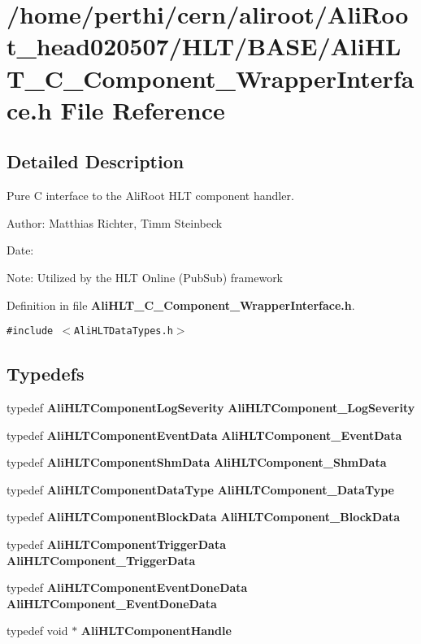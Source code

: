\section{/home/perthi/cern/aliroot/Ali\-Root\_\-head020507/HLT/BASE/Ali\-HLT\_\-C\_\-Component\_\-Wrapper\-Interface.h File Reference}
\label{AliHLT__C__Component__WrapperInterface_8h}


\subsection{Detailed Description}
Pure C interface to the Ali\-Root HLT component handler. 

\begin{Desc}
\item[Author:]Matthias Richter, Timm Steinbeck \end{Desc}
\begin{Desc}
\item[Date:]\end{Desc}
\begin{Desc}
\item[Note:]Utilized by the HLT Online (Pub\-Sub) framework\end{Desc}


Definition in file {\bf Ali\-HLT\_\-C\_\-Component\_\-Wrapper\-Interface.h}.

{\tt \#include $<$Ali\-HLTData\-Types.h$>$}\par
\subsection*{Typedefs}
\begin{CompactItemize}
\item 
typedef {\bf Ali\-HLTComponent\-Log\-Severity} {\bf Ali\-HLTComponent\_\-Log\-Severity}
\item 
typedef {\bf Ali\-HLTComponent\-Event\-Data} {\bf Ali\-HLTComponent\_\-Event\-Data}
\item 
typedef {\bf Ali\-HLTComponent\-Shm\-Data} {\bf Ali\-HLTComponent\_\-Shm\-Data}
\item 
typedef {\bf Ali\-HLTComponent\-Data\-Type} {\bf Ali\-HLTComponent\_\-Data\-Type}
\item 
typedef {\bf Ali\-HLTComponent\-Block\-Data} {\bf Ali\-HLTComponent\_\-Block\-Data}
\item 
typedef {\bf Ali\-HLTComponent\-Trigger\-Data} {\bf Ali\-HLTComponent\_\-Trigger\-Data}
\item 
typedef {\bf Ali\-HLTComponent\-Event\-Done\-Data} {\bf Ali\-HLTComponent\_\-Event\-Done\-Data}
\item 
typedef void $\ast$ {\bf Ali\-HLTComponent\-Handle}
\end{CompactItemize}
